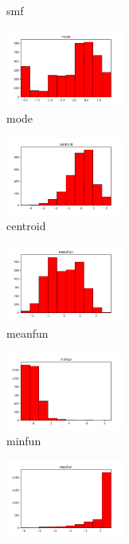 \documentclass[a4paper]{article}
\begin{document}
\begin{figure}
\begin{subfigure}{0.32\textwidth}
        \caption{smf}
        \label{fig:sub_std_9}
    \end{subfigure}\hfill
    \begin{subfigure}{0.32\textwidth}
        \centering
        \includegraphics[width=3.85cm]{std_9_mode}
        \caption{mode}
        \label{fig:sub_std_10}
    \end{subfigure}\hfill
    \begin{subfigure}{0.32\textwidth}
        \centering
        \includegraphics[width=3.85cm]{std_10_centroid}
        \caption{centroid}
        \label{fig:sub_std_11}
    \end{subfigure}\hfill
    \begin{subfigure}{0.32\textwidth}
        \centering
        \includegraphics[width=3.85cm]{std_11_meanfun}
        \caption{meanfun}
        \label{fig:sub_std_12}
    \end{subfigure}\hfill
    \begin{subfigure}{0.32\textwidth}
        \centering
        \includegraphics[width=3.85cm]{std_12_minfun}
        \caption{minfun}
        \label{fig:sub_std_13}
    \end{subfigure}\hfill
    \begin{subfigure}{0.32\textwidth}
        \centering
        \includegraphics[width=3.85cm]{std_13_maxfun}

\end{subfigure}
\end{figure}
\end{document}
